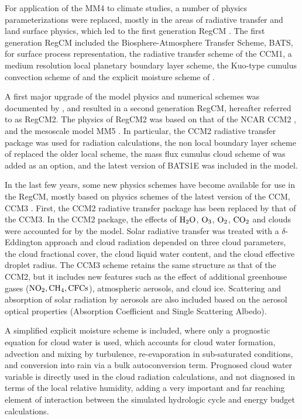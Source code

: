 For application of the \ac{MM4} to climate studies, a number of physics
parameterizations were replaced, mostly in the areas of radiative transfer and
land surface physics, which led to the first generation \ac{RegCM}
\citep{Dickinson_89,Giorgi_90}. The first generation \ac{RegCM} included the
Biosphere-Atmosphere Transfer Scheme, BATS, \citep{Dickinson_86} for surface
process representation, the radiative transfer scheme of the \ac{CCM1}, a medium
resolution local planetary boundary layer scheme, the Kuo-type cumulus
convection scheme of \citep{Anthes_77} and the explicit moisture scheme of
\citep{Hsie_84}.

A first major upgrade of the model physics and numerical schemes was documented
by \citep{Giorgi_93,Giorgi_93b}, and resulted in a second generation \ac{RegCM},
hereafter referred to as \ac{RegCM2}. The physics of \ac{RegCM2} was based on
that of the \ac{NCAR} \ac{CCM2} \citep{Hack_93}, and the mesoscale model
\ac{MM5} \citep{Grell_94}. In particular, the \ac{CCM2} radiative transfer
package \citep{Briegleb_92} was used for radiation calculations, the non local
boundary layer scheme of \citep{Holtslag_90} replaced the older local scheme,
the mass flux cumulus cloud scheme of \citep{Grell_93} was added as an option,
and the latest version of BATS1E \citep{Dickinson_93} was included in the model.

In the last few years, some new physics schemes have become available for use in
the \ac{RegCM}, mostly based on physics schemes of the latest version of the
\ac{CCM}, \ac{CCM3} \citep{Kiehl_96}. First, the \ac{CCM2} radiative transfer
package has been replaced by that of the \ac{CCM3}. In the \ac{CCM2} package,
the effects of ${\rm H_2O}$, ${\rm O_3}$, ${\rm O_2}$, ${\rm CO_2}$ and clouds
were accounted for by the model. Solar radiative transfer was treated with a
$\delta$-Eddington approach and cloud radiation depended on three cloud
parameters, the cloud fractional cover, the cloud liquid water content, and the
cloud effective droplet radius. The \ac{CCM3} scheme retains the same structure
as that of the \ac{CCM2}, but it includes new features such as the effect of
additional greenhouse gases (${\rm NO_2, CH_4, CFCs}$), atmospheric aerosols,
and cloud ice. Scattering and absorption of solar radiation by aerosols are
also included based on the aerosol optical properties (Absorption Coefficient
and Single Scattering Albedo).
 
A simplified explicit moisture scheme \citet{Hsie_84} is included, where only a
prognostic equation for cloud water is used, which accounts for cloud water
formation, advection and mixing by turbulence, re-evaporation in sub-saturated
conditions, and conversion into rain via a bulk autoconversion term.
Prognosed cloud water variable is directly used in the cloud
radiation calculations, and not diagnosed in terms of the local
relative humidity, adding a very important and far reaching element of
interaction between the simulated hydrologic cycle and energy budget
calculations. 

